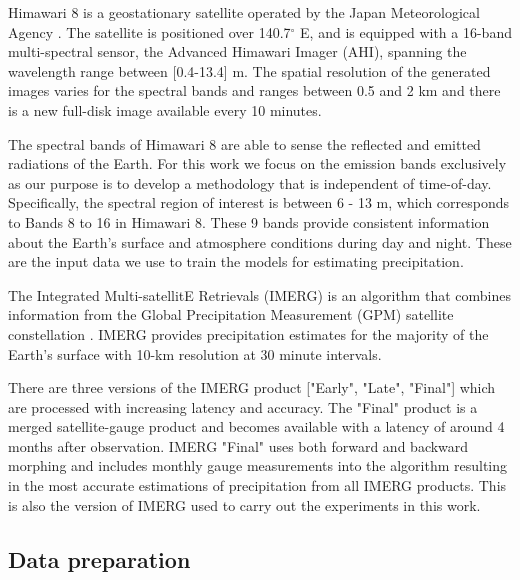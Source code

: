 \documentclass[3p,times]{elsarticle}
\begin{document}
Himawari 8 is a geostationary satellite operated by the Japan Meteorological Agency \citep{bessho2016introduction}. The satellite is positioned over 140.7$^\circ$ E, and is equipped with a 16-band multi-spectral sensor, the Advanced Himawari Imager (AHI), spanning the wavelength range between [0.4-13.4] \textmu m. The spatial resolution of the generated images varies for the spectral bands and ranges between 0.5 and 2 km and there is a new full-disk image available every 10 minutes.

The spectral bands of Himawari 8 are able to sense the reflected and emitted radiations of the Earth. For this work we focus on the emission bands exclusively as our purpose is to develop a methodology that is independent of time-of-day. Specifically, the spectral region of interest is between 6 - 13 \textmu m, which corresponds to Bands 8 to 16 in Himawari 8. These 9 bands provide consistent information about the Earth's surface and atmosphere conditions during day and night. These are the input data we use to train the models for estimating precipitation.

The Integrated Multi-satellitE Retrievals (IMERG) is an algorithm that combines information from the Global Precipitation Measurement (GPM) satellite constellation \citep{huffman2015integrated}. IMERG provides precipitation estimates for the majority of the Earth's surface with 10-km resolution at 30 minute intervals.

There are three versions of the IMERG product ["Early", "Late", "Final"] which are processed with increasing  latency and accuracy. The "Final" product is a merged satellite-gauge product and becomes available with a latency of around 4 months after observation. IMERG "Final" uses both forward and backward morphing and includes monthly gauge measurements into the algorithm resulting in the most accurate estimations of precipitation from all IMERG products. This is also the version of IMERG used to carry out the experiments in this work.

\subsection{Data preparation}
\end{document}
